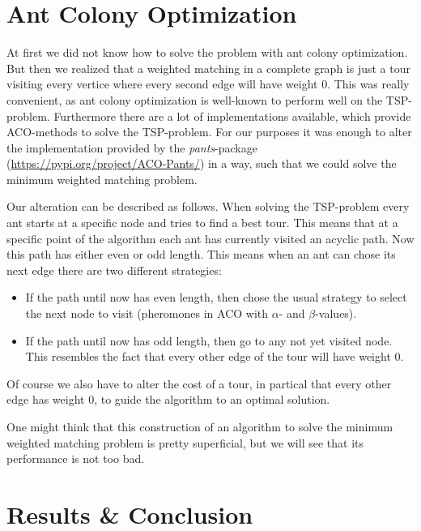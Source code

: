 \documentclass[12pt]{article}
\begin{document}
\section{Ant Colony Optimization}
At first we did not know how to solve the problem with ant colony optimization.
But then we realized that a weighted matching in a complete graph is just a tour visiting every vertice where every second edge will have weight 0.
This was really convenient, as ant colony optimization is well-known to perform well on the TSP-problem.
Furthermore there are a lot of implementations available, which provide ACO-methods to solve the TSP-problem.
For our purposes it was enough to alter the implementation provided by the \textit{pants}-package (\url{https://pypi.org/project/ACO-Pants/}) in a way, such that we could solve the minimum weighted matching problem.

Our alteration can be described as follows.
When solving the TSP-problem every ant starts at a specific node and tries to find a best tour.
This means that at a specific point of the algorithm each ant has currently visited an acyclic path.
Now this path has either even or odd length.
This means when an ant can chose its next edge there are two different strategies:
\begin{itemize}
    \item If the path until now has even length, then chose the usual strategy to select the next node to visit (pheromones in ACO with $\alpha$- and $\beta$-values).
    \item If the path until now has odd length, then go to any not yet visited node.
    This resembles the fact that every other edge of the tour will have weight 0.
\end{itemize}
Of course we also have to alter the cost of a tour, in partical that every other edge has weight 0, to guide the algorithm to an optimal solution.

One might think that this construction of an algorithm to solve the minimum weighted matching problem is pretty superficial, but we will see that its performance is not too bad.

\section{Results \& Conclusion}



\end{document}
